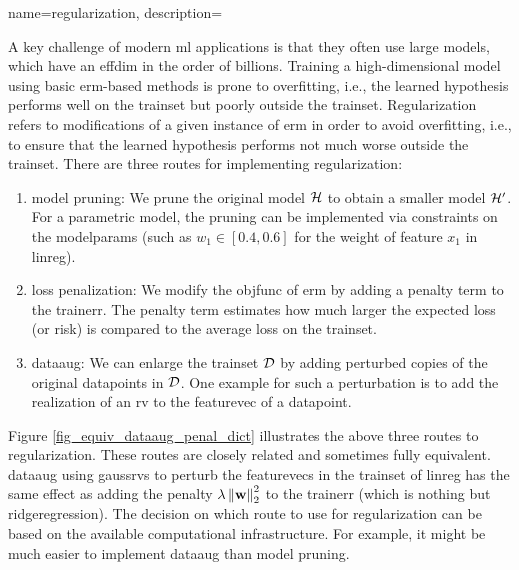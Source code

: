 {name={regularization}, 
  description={A key challenge of modern \gls{ml} applications 
  	    is that they often use large \glspl{model}, which have an \gls{effdim} in the order 
  	    of billions. Training a high-dimensional \gls{model} using basic \gls{erm}-based 
  	    methods is prone to \gls{overfitting}, i.e., the learned \gls{hypothesis} performs 
  	    well on the \gls{trainset} but poorly outside the \gls{trainset}. Regularization refers 
  	    to modifications of a given instance of \gls{erm} in order to avoid \gls{overfitting}, 
  	    i.e., to ensure that the learned \gls{hypothesis} performs not much worse outside 
  	    the \gls{trainset}. There are three routes for implementing regularization: 
		\begin{enumerate}[label=\arabic*)]
			\item {\Gls{model} pruning:} We prune the original \gls{model} $\mathcal{H}$ to obtain a 
			smaller \gls{model} $\mathcal{H}'$. For a parametric \gls{model}, the pruning can be 
			implemented via constraints on the \gls{modelparams} (such as $w_{1} \in [0.4,0.6]$ for 
			the weight of \gls{feature} $x_{1}$ in \gls{linreg}).
			\item {\Gls{loss} penalization:} We modify the \gls{objfunc} of \gls{erm} by adding a 
			penalty term to the \gls{trainerr}. The penalty term estimates how much larger the expected \gls{loss} (or \gls{risk}) 
			is compared to the average \gls{loss} on the \gls{trainset}. 
			\item {\Gls{dataaug}:} We can enlarge the \gls{trainset} $\mathcal{D}$ by adding 
			perturbed copies of the original \glspl{datapoint} in $\mathcal{D}$. One example for such 
			a perturbation is to add the \gls{realization} of an \gls{rv} to the \gls{featurevec} 
			of a \gls{datapoint}. 
		\end{enumerate} 
		Figure \ref{fig_equiv_dataaug_penal_dict} illustrates the above three routes to regularization. 
		These routes are closely related and sometimes fully equivalent. \Gls{dataaug} using \glspl{gaussrv} 
		to perturb the \glspl{featurevec} in the \gls{trainset} of \gls{linreg} 
		has the same effect as adding the penalty 
		$\lambda \left\Vert {{\bf w}} \right\Vert_{2}^2$ to the \gls{trainerr} (which is nothing but \gls{ridgeregression}). 
        		The decision on which route to use for regularization can be based on the 
        		available computational infrastructure. For example, it might be much easier to 
        		implement \gls{dataaug} than \gls{model} pruning. 
}}

